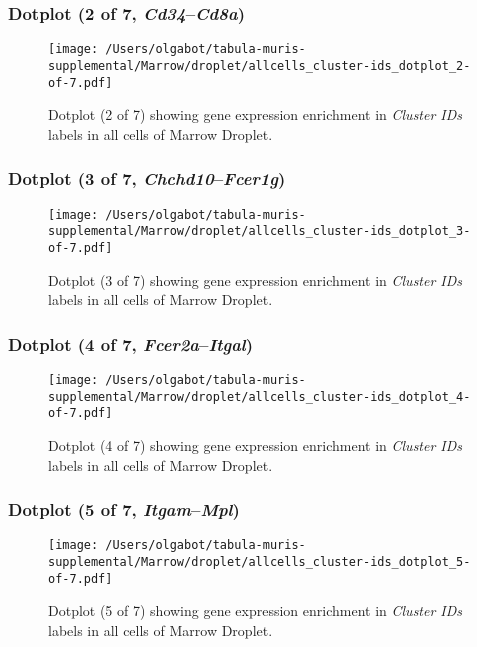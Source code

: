 \clearpage

\subsubsection{Dotplot (2 of 7, \emph{Cd34}--\emph{Cd8a})}
\begin{figure}[h]
\centering
\texttt{[image: /Users/olgabot/tabula-muris-supplemental/Marrow/droplet/allcells\_cluster-ids\_dotplot\_2-of-7.pdf]}

\caption{ Dotplot (2 of 7)  showing gene expression enrichment in \emph{Cluster IDs} labels in all cells of Marrow Droplet. }
\end{figure}


\clearpage

\subsubsection{Dotplot (3 of 7, \emph{Chchd10}--\emph{Fcer1g})}
\begin{figure}[h]
\centering
\texttt{[image: /Users/olgabot/tabula-muris-supplemental/Marrow/droplet/allcells\_cluster-ids\_dotplot\_3-of-7.pdf]}

\caption{ Dotplot (3 of 7)  showing gene expression enrichment in \emph{Cluster IDs} labels in all cells of Marrow Droplet. }
\end{figure}


\clearpage

\subsubsection{Dotplot (4 of 7, \emph{Fcer2a}--\emph{Itgal})}
\begin{figure}[h]
\centering
\texttt{[image: /Users/olgabot/tabula-muris-supplemental/Marrow/droplet/allcells\_cluster-ids\_dotplot\_4-of-7.pdf]}

\caption{ Dotplot (4 of 7)  showing gene expression enrichment in \emph{Cluster IDs} labels in all cells of Marrow Droplet. }
\end{figure}


\clearpage

\subsubsection{Dotplot (5 of 7, \emph{Itgam}--\emph{Mpl})}
\begin{figure}[h]
\centering
\texttt{[image: /Users/olgabot/tabula-muris-supplemental/Marrow/droplet/allcells\_cluster-ids\_dotplot\_5-of-7.pdf]}

\caption{ Dotplot (5 of 7)  showing gene expression enrichment in \emph{Cluster IDs} labels in all cells of Marrow Droplet. }
\end{figure}


